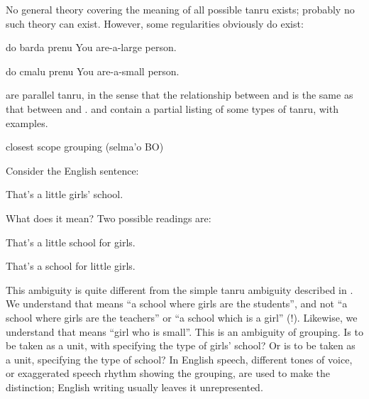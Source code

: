 No general theory covering the meaning of all possible tanru
    exists; probably no such theory can exist. However, some
    regularities obviously do exist:
\begin{example}
do barda prenu\n
You are-a-large person.
\end{example}

\begin{example}
do cmalu prenu\n
You are-a-small person.
\end{example}

{\noindent}are parallel tanru, in the sense that the relationship between
     and  is the same as that between 
    and .  and  contain a partial listing of some
    types of tanru, with examples.



\begin{description}
\item[bo] closest scope grouping (selma'o BO)
\end{description}
    Consider the English sentence:
\begin{example}
That's a little girls' school.
\end{example}

What does it mean? Two possible readings are:
\begin{example}
That's a little school for girls.
\end{example}

\begin{example}
That's a school for little girls.
\end{example}

This ambiguity is quite different from the simple tanru
    ambiguity described in . We
    understand that  means ``a school where girls
    are the students'', and not ``a school where girls are the
    teachers'' or ``a school which is a girl'' (!). Likewise, we
    understand that  means ``girl who is small''.
    This is an ambiguity of grouping. Is  to be
    taken as a unit, with  specifying the type of girls'
    school? Or is  to be taken as a unit, specifying
    the type of school? In English speech, different tones of
    voice, or exaggerated speech rhythm showing the grouping, are
    used to make the distinction; English writing usually leaves it
    unrepresented. 

